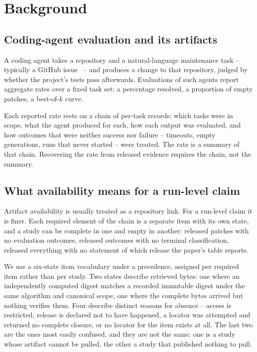 \section{Background}
\label{sec:background}

\subsection{Coding-agent evaluation and its artifacts}

A coding agent takes a repository and a natural-language maintenance task -- typically a
GitHub issue~\cite{SweAgentAgent2024,DemystifyingLlmBased2025} -- and produces a change to
that repository, judged by whether the project's
tests pass afterwards. Evaluations of such agents report aggregate rates over a fixed task
set: a percentage resolved, a proportion of empty patches, a best-of-$k$ curve.

Each reported rate rests on a chain of per-task records: which tasks were in scope, what the
agent produced for each, how each output was evaluated, and how outcomes that were neither
success nor failure -- timeouts, empty generations, runs that never started -- were treated.
The rate is a summary of that chain. Recovering the rate from released evidence requires the
chain, not the summary.

\subsection{What availability means for a run-level claim}

Artifact availability is usually treated as a repository link. For a run-level claim it is
finer. Each required element of the chain is a separate item with its own state, and a study
can be complete in one and empty in another: released patches with no evaluation outcomes,
released outcomes with no terminal classification, released everything with no statement of
which release the paper's table reports.

We use a six-state item vocabulary under a precedence, assigned per required item rather
than per study. Two states describe retrieved bytes: one where an independently computed
digest matches a recorded immutable digest under the same algorithm and canonical scope, one
where the complete bytes arrived but nothing verifies them. Four describe distinct reasons
for absence -- access is restricted, release is declared not to have happened, a locator was
attempted and returned no complete closure, or no locator for the item exists at all. The
last two are the ones most easily confused, and they are not the same: one is a study whose
artifact cannot be pulled, the other a study that published nothing to pull.


